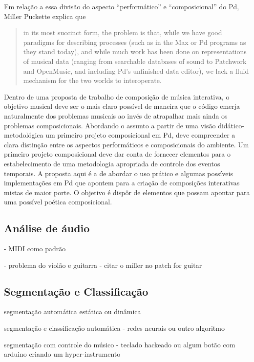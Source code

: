 \documentclass{ppgmus}
\begin{document}
Em relação a essa divisão do aspecto ``performático'' e
``composicional'' do Pd, Miller Puckette explica que

\begin{quote}
  in its most succinct form, the problem is that, while we have good
  paradigms for describing processes (such as in the Max or Pd
  programs as they stand today), and while much work has been done on
  representations of musical data (ranging from searchable databases
  of sound to Patchwork and OpenMusic, and including Pd's unfinished
  data editor), we lack a fluid mechanism for the two worlds to
  interoperate. \cite{puckette04:divide}
\end{quote}

Dentro de uma proposta de trabalho de composição de música interativa,
o objetivo musical deve ser o mais claro possível de maneira que o
código emerja naturalmente dos problemas musicais ao invés de
atrapalhar mais ainda os problemas composicionais. Abordando o assunto
a partir de uma visão didático-metodológica um primeiro projeto
composicional em Pd, deve compreender a clara distinção entre os
aspectos performáticos e composicionais do ambiente. Um primeiro
projeto composicional deve dar conta de fornecer elementos para o
estabelecimento de uma metodologia apropriada de controle dos eventos
temporais. A proposta aqui é a de abordar o uso prático e algumas
possíveis implementações em Pd que apontem para a criação de
composições interativas mistas de maior porte. O objetivo é dispôr de
elementos que possam apontar para uma possível poética composicional.


\subsection{Análise de áudio}


- MIDI como padrão

- problema do violão e guitarra - citar o miller no patch for guitar


\subsection{Segmentação e Classificação}

segmentação automática estática ou dinâmica

segmentação e classificação automática - redes neurais ou outro algoritmo

segmentação com controle do músico - teclado hackeado ou
algum botão com arduino criando um hyper-instrumento
\end{document}
